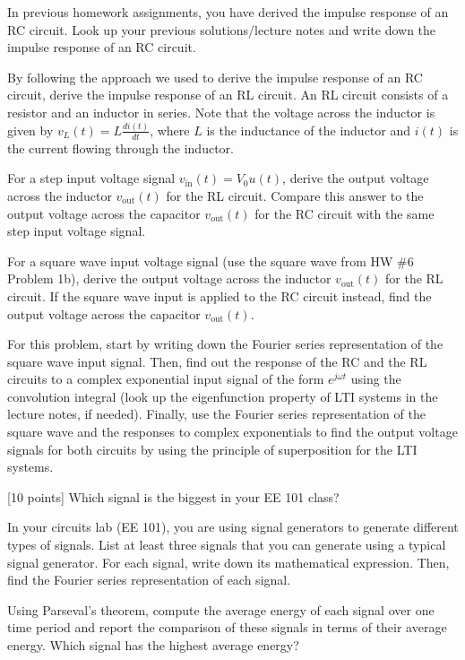 \documentclass{ee102_pset}
\author{\rule{3cm}{0.4pt}} %
\begin{document}

\problempart [5 points] In previous homework assignments, you have derived the impulse response of an RC circuit. Look up your previous solutions/lecture notes and write down the impulse response of an RC circuit.

\problempart [20 points] By following the approach we used to derive the impulse response of an RC circuit, derive the impulse response of an RL circuit. An RL circuit consists of a resistor and an inductor in series. Note that the voltage across the inductor is given by $v_L(t) = L \frac{di(t)}{dt}$, where $L$ is the inductance of the inductor and $i(t)$ is the current flowing through the inductor.

\problempart [20 points] For a step input voltage signal $v_{\text{in}}(t) = V_0 u(t)$, derive the output voltage across the inductor $v_{\text{out}}(t)$ for the RL circuit. Compare this answer to the output voltage across the capacitor $v_{\text{out}}(t)$ for the RC circuit with the same step input voltage signal.

\problempart [25 points] For a square wave input voltage signal (use the square wave from HW \#6 Problem 1b), derive the output voltage across the inductor $v_{\text{out}}(t)$ for the RL circuit. If the square wave input is applied to the RC circuit instead, find the output voltage across the capacitor $v_{\text{out}}(t)$.

For this problem, start by writing down the Fourier series representation of the square wave input signal. Then, find out the response of the RC and the RL circuits to a complex exponential input signal of the form $e^{j \omega t}$ using the convolution integral (look up the eigenfunction property of LTI systems in the lecture notes, if needed). Finally, use the Fourier series representation of the square wave and the responses to complex exponentials to find the output voltage signals for both circuits by using the principle of superposition for the LTI systems.

[10 points] Which signal is the biggest in your EE 101 class? 

In your circuits lab (EE 101), you are using signal generators to generate different types of signals. List at least three signals that you can generate using a typical signal generator. For each signal, write down its mathematical expression. Then, find the Fourier series representation of each signal.

Using Parseval's theorem, compute the average energy of each signal over one time period and report the comparison of these signals in terms of their average energy. Which signal has the highest average energy?
\end{document}
